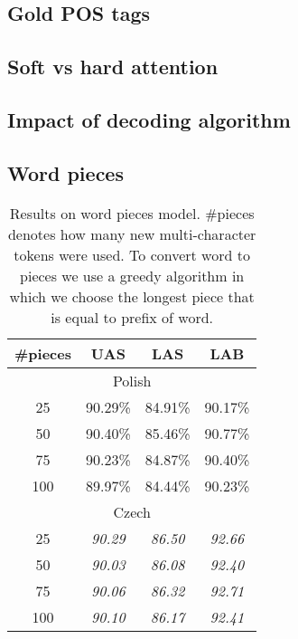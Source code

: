 \subsection{Gold POS tags}


\subsection{Soft vs hard attention}


\subsection{Impact of decoding algorithm}


\subsection{Word pieces}
\begin{table}[!htbp]
    \centering
    \begin{tabular}{c c c c}
        \#pieces & UAS & LAS & LAB \\ \hline
        \multicolumn{4}{c}{Polish}\\
        25 & 90.29\%  & 84.91\%  & 90.17\% \\
        50 & 90.40\%  & 85.46\%  & 90.77\% \\
        75 & 90.23\%  & 84.87\%  & 90.40\% \\
        100 & 89.97\%  & 84.44\%  & 90.23\% \\
        \multicolumn{4}{c}{Czech}\\
        25 & \textit{90.29}& \textit{86.50} & \textit{92.66}\\
        50 & \textit{90.03} & \textit{86.08} & \textit{92.40} \\
        75 & \textit{90.06} & \textit{86.32} & \textit{92.71} \\
        100 & \textit{90.10} & \textit{86.17} & \textit{92.41} \\
    \end{tabular}
    \caption{Results on word pieces model. \#pieces denotes how many new
    multi-character tokens were used. To convert word to pieces we
    use a greedy algorithm in which we choose the longest piece that is equal
    to prefix of word.}
    \label{tab:word_pieces}
\end{table}


